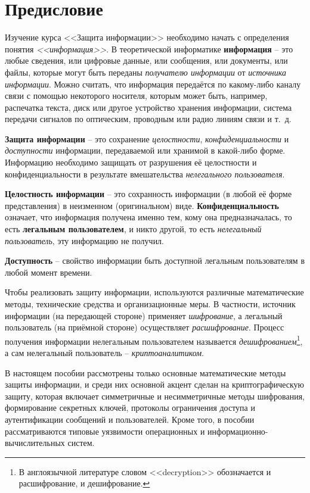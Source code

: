\chapter*{Предисловие}

Изучение курса <<Защита информации>> необходимо начать с определения понятия \emph{<<информация>>}. В теоретической информатике \textbf{информация} -- это любые сведения, или цифровые данные, или сообщения, или документы, или файлы, которые могут быть переданы \emph{получателю информации} от \emph{источника информации}. Можно считать, что информация передаётся по какому-либо каналу связи с помощью некоторого носителя, которым может быть, например, распечатка текста, диск или другое устройство хранения информации, система передачи сигналов по оптическим, проводным или радио линиям связи и т.~д.

\textbf{Защита информации} -- это сохранение \emph{целостности}, \emph{конфиденциальности} и \emph{доступности} информации, передаваемой или хранимой в какой-либо форме. Информацию необходимо защищать от разрушения её целостности и конфиденциальности в результате вмешательства \emph{нелегального пользователя}.

\textbf{Целостность информации} -- это сохранность информации (в любой её форме представления) в неизменном (оригинальном) виде. \textbf{Конфиденциальность} означает, что информация получена именно тем, кому она предназначалась, то есть \textbf{легальным пользователем}, и никто другой, то есть \emph{нелегальный пользователь}, эту информацию не получил.

\textbf{Доступность} -- свойство информации быть доступной легальным пользователям в любой момент времени.

Чтобы реализовать защиту информации, используются различные математические методы, технические средства и организационные меры. В частности, источник информации (на передающей стороне) применяет \emph{шифрование}, а легальный пользователь (на приёмной стороне) осуществляет \emph{расшифрование}. Процесс получения информации нелегальным пользователем называется \emph{дешифрованием}\footnote{В англоязычной литературе словом <<decryption>> обозначается и расшифрование, и дешифрование.}, а сам нелегальный пользователь -- \emph{криптоаналитиком}.

В настоящем пособии рассмотрены только основные математические методы защиты информации, и среди них основной акцент сделан на криптографическую защиту, которая включает симметричные и несимметричные методы шифрования, формирование секретных ключей, протоколы ограничения доступа и аутентификации сообщений и пользователей. Кроме того, в пособии рассматриваются типовые уязвимости операционных и информационно-вычислительных систем.

